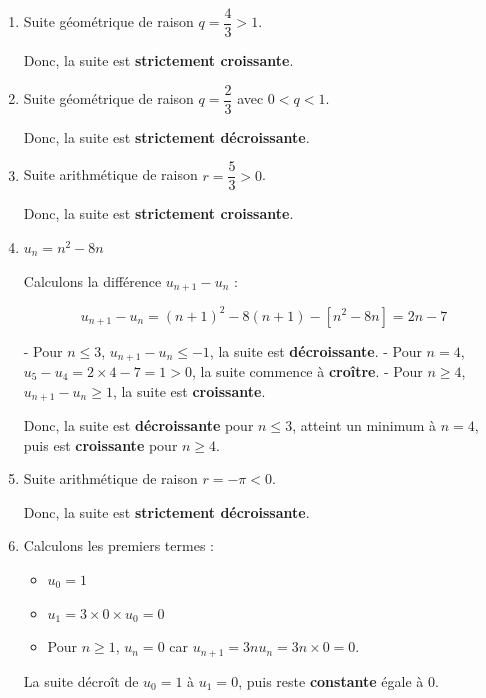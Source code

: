 \documentclass{article}
\begin{document}
\begin{enumerate}[label=\alph*)]

\item Suite géométrique de raison \( q = \dfrac{4}{3} > 1 \).

Donc, la suite est \textbf{strictement croissante}.

\bigskip

\item Suite géométrique de raison \( q = \dfrac{2}{3} \) avec \( 0 < q < 1 \).

Donc, la suite est \textbf{strictement décroissante}.

\bigskip

\item Suite arithmétique de raison \( r = \dfrac{5}{3} > 0 \).

Donc, la suite est \textbf{strictement croissante}.

\bigskip

\item \( u_n = n^2 - 8n \)

Calculons la différence \( u_{n+1} - u_n \) :

\[ u_{n+1} - u_n = (n+1)^2 - 8(n+1) - [n^2 - 8n] = 2n - 7 \]

- Pour \( n \leq 3 \), \( u_{n+1} - u_n \leq -1 \), la suite est \textbf{décroissante}.
- Pour \( n = 4 \), \( u_{5} - u_{4} = 2 \times 4 - 7 = 1 > 0 \), la suite commence à \textbf{croître}.
- Pour \( n \geq 4 \), \( u_{n+1} - u_n \geq 1 \), la suite est \textbf{croissante}.

Donc, la suite est \textbf{décroissante} pour \( n \leq 3 \), atteint un minimum à \( n = 4 \), puis est \textbf{croissante} pour \( n \geq 4 \).

\bigskip

\item Suite arithmétique de raison \( r = -\pi < 0 \).

Donc, la suite est \textbf{strictement décroissante}.

\bigskip

\item Calculons les premiers termes :

\begin{itemize}
    \item \( u_0 = 1 \)
    \item \( u_1 = 3 \times 0 \times u_0 = 0 \)
    \item Pour \( n \geq 1 \), \( u_n = 0 \) car \( u_{n+1} = 3n u_n = 3n \times 0 = 0 \).
\end{itemize}

La suite décroît de \( u_0 = 1 \) à \( u_1 = 0 \), puis reste \textbf{constante} égale à 0.

\end{enumerate}
\end{document}
